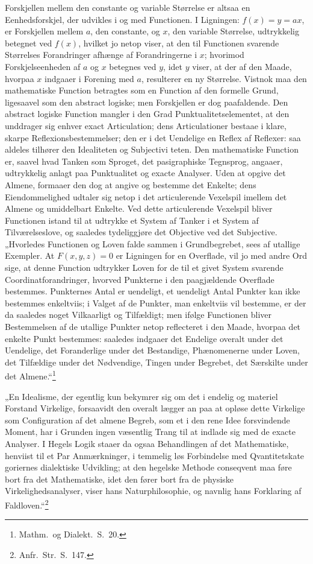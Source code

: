 \documentclass[12pt]{book}
\newcommand{\opage}[1]{\marginnote{\footnotesize\textit{[#1]}}}
\begin{document}
Forskjellen mellem den constante og variable Størrelse er altsaa en Eenhedsforskjel, der udvikles i og
med Functionen. I Ligningen: $f(x) = y = ax$, er Forskjellen mellem $a$, den constante, og $x$, den
variable Størrelse, udtrykkelig betegnet ved $f(x)$, hvilket jo netop viser, at den til Functionen
svarende Størrelses Forandringer afhænge af Forandringerne i $x$; hvorimod Forskjelseenheden af $a$ og
$x$ betegnes ved $y$, idet $y$ viser, at der af den Maade, hvorpaa $x$ indgaaer i Forening med $a$,
resulterer en ny Størrelse. Vistnok maa den mathematiske Function betragtes som en Function af den
formelle Grund, ligesaavel som den abstract logiske; men Forskjellen er dog paafaldende. Den abstract
logiske Function mangler i den Grad Punktualitetselementet, at den unddrager sig enhver exact
Articulation; dens Articulationer bestaae i klare, skarpe Reflexionsbestemmelser; den er i det Uendelige
en Reflex af Reflexer: saa aldeles tilhører den Idealiteten og Subjectivi%
\opage{300} teten. Den mathematiske Function er, saavel hvad Tanken som Sproget, det pasigraphiske Tegnsprog,
angaaer, udtrykkelig anlagt paa Punktualitet og exacte Analyser. Uden at opgive det Almene, formaaer
den dog at angive og bestemme det Enkelte; dens Eiendommelighed udtaler sig netop i det articulerende
Vexelspil imellem det Almene og umiddelbart Enkelte. Ved dette articulerende Vexelspil bliver Functionen
istand til at udtrykke et System af Tanker i et System af Tilværelseslove, og saaledes tydeliggjøre det
Objective ved det Subjective. „Hvorledes Functionen og Loven falde sammen i Grundbegrebet, sees af
utallige Exempler. At $F(x, y, z) = 0$ er Ligningen for en Overflade, vil jo med andre Ord sige, at
denne Function udtrykker Loven for de til et givet System svarende Coordinatforandringer, hvorved
Punkterne i den paagjældende Overflade bestemmes. Punkternes Antal er uendeligt, et uendeligt Antal
Punkter kan ikke bestemmes enkeltviis; i Valget af de Punkter, man enkeltviis vil bestemme, er der da
saaledes noget Vilkaarligt og Tilfældigt; men ifølge Functionen bliver Bestemmelsen af de utallige
Punkter netop reflecteret i den Maade, hvorpaa det enkelte Punkt bestemmes: saaledes indgaaer det
Endelige overalt under det Uendelige, det Foranderlige under det Bestandige, Phænomenerne under Loven,
det Tilfældige under det Nødvendige, Tingen under Begrebet, det Særskilte under det
Almene.“\footnote{Mathm.\ og Dialekt.\ S.~20.}

„En Idealisme, der egentlig kun bekymrer sig om det i endelig og materiel Forstand Virkelige,
forsaavidt den overalt lægger an paa at opløse dette Virkelige som Configuration af det almene Begreb,
som et i den rene Idee forsvindende Moment, har i Grunden ingen væsentlig Trang til at indlade sig med
de exacte Analyser. I Hegels Logik staaer da ogsaa Behandlingen af det Mathematiske, henviist til et Par
Anmærkninger, i temmelig løs Forbindelse med Qvantitetskate%
\opage{301} goriernes dialektiske Udvikling; at den hegelske Methode conseqvent maa føre bort fra det Mathematiske,
idet den fører bort fra de physiske Virkelighedsanalyser, viser hans Naturphilosophie, og navnlig hans
Forklaring af Faldloven.“\footnote{Anfr.\ Str.\ S.~147.}
\end{document}
